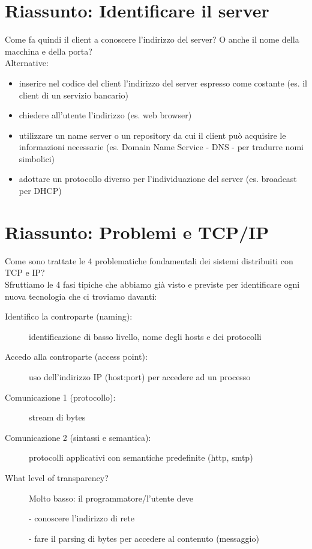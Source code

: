 \section{Riassunto: Identificare il server}
Come fa quindi il client a conoscere l'indirizzo del server? O anche il nome della macchina e della porta?
\\Alternative:
\begin{itemize}
    \item inserire nel codice del client l'indirizzo del server espresso come costante (es. il client di un servizio bancario)
    \item chiedere all'utente l'indirizzo (es. web browser)
    \item utilizzare un name server o un repository da cui il client può acquisire le informazioni necessarie (es. Domain Name Service - DNS - per tradurre nomi simbolici)
    \item adottare un protocollo diverso per l'individuazione del server (es. broadcast per DHCP)
\end{itemize}

\section{Riassunto: Problemi e TCP/IP}
Come sono trattate le 4 problematiche fondamentali dei sistemi distribuiti con TCP e IP?
\\Sfruttiamo le 4 fasi tipiche che abbiamo già visto e previste per identificare ogni nuova tecnologia che ci troviamo davanti:
\begin{description}
    \item[Identifico la controparte (naming):] identificazione di basso livello, nome degli hosts e dei protocolli
    \item[Accedo alla controparte (access point):] uso dell'indirizzo IP (host:port) per accedere ad un processo
    \item[Comunicazione 1 (protocollo):] stream di bytes
    \item[Comunicazione 2 (sintassi e semantica):] protocolli applicativi con semantiche predefinite (http, smtp)
    \item[What level of transparency?] Molto basso: il programmatore/l'utente deve
    \item[] - conoscere l'indirizzo di rete
    \item[] - fare il parsing di bytes per accedere al contenuto (messaggio)
\end{description}

